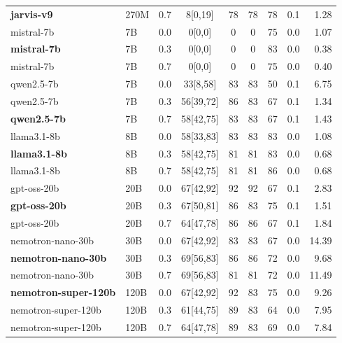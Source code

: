 \begin{table}[t]
\begin{tabular}{llrcccccr}
\textbf{jarvis-v9} & 270M & 0.7 & 8[0,19] & 78 & 78 & 78 & 0.1 & 1.28 \\
mistral-7b & 7B & 0.0 & 0[0,0] & 0 & 0 & 75 & 0.0 & 1.07 \\
\textbf{mistral-7b} & 7B & 0.3 & 0[0,0] & 0 & 0 & 83 & 0.0 & 0.38 \\
mistral-7b & 7B & 0.7 & 0[0,0] & 0 & 0 & 75 & 0.0 & 0.40 \\
qwen2.5-7b & 7B & 0.0 & 33[8,58] & 83 & 83 & 50 & 0.1 & 6.75 \\
qwen2.5-7b & 7B & 0.3 & 56[39,72] & 86 & 83 & 67 & 0.1 & 1.34 \\
\textbf{qwen2.5-7b} & 7B & 0.7 & 58[42,75] & 83 & 83 & 67 & 0.1 & 1.43 \\
llama3.1-8b & 8B & 0.0 & 58[33,83] & 83 & 83 & 83 & 0.0 & 1.08 \\
\textbf{llama3.1-8b} & 8B & 0.3 & 58[42,75] & 81 & 81 & 83 & 0.0 & 0.68 \\
llama3.1-8b & 8B & 0.7 & 58[42,75] & 81 & 81 & 86 & 0.0 & 0.68 \\
gpt-oss-20b & 20B & 0.0 & 67[42,92] & 92 & 92 & 67 & 0.1 & 2.83 \\
\textbf{gpt-oss-20b} & 20B & 0.3 & 67[50,81] & 86 & 83 & 75 & 0.1 & 1.51 \\
gpt-oss-20b & 20B & 0.7 & 64[47,78] & 86 & 86 & 67 & 0.1 & 1.84 \\
nemotron-nano-30b & 30B & 0.0 & 67[42,92] & 83 & 83 & 67 & 0.0 & 14.39 \\
\textbf{nemotron-nano-30b} & 30B & 0.3 & 69[56,83] & 86 & 86 & 72 & 0.0 & 9.68 \\
nemotron-nano-30b & 30B & 0.7 & 69[56,83] & 81 & 81 & 72 & 0.0 & 11.49 \\
\textbf{nemotron-super-120b} & 120B & 0.0 & 67[42,92] & 92 & 83 & 75 & 0.0 & 9.26 \\
nemotron-super-120b & 120B & 0.3 & 61[44,75] & 89 & 83 & 64 & 0.0 & 7.95 \\
nemotron-super-120b & 120B & 0.7 & 64[47,78] & 89 & 83 & 69 & 0.0 & 7.84 \\
\bottomrule
\end{tabular}
\end{table}